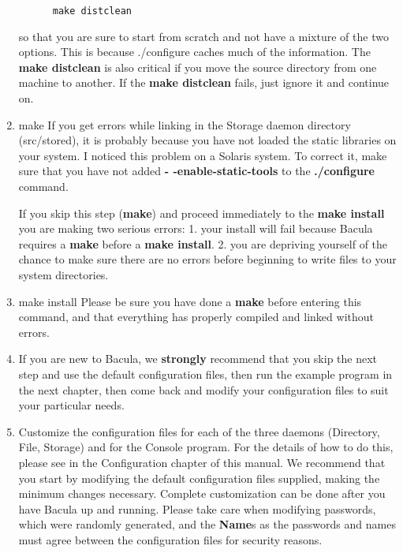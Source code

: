 \begin{enumerate}
\footnotesize
\begin{verbatim}
      make distclean
\end{verbatim}
\normalsize

so that you are sure to start from scratch and not have a  mixture of the two
options. This is because ./configure  caches much of the information. The {\bf
make distclean}  is also critical if you move the source directory from one 
machine to another. If the {\bf make distclean} fails,  just ignore it and
continue on.  

\item make  
   If you get errors while linking in the Storage daemon directory
   (src/stored), it is probably because you have not loaded the static
   libraries on your system.  I noticed this problem on a Solaris system.
   To correct it, make sure that you have not added {\bf
   {-} {-}enable-static-tools} to the {\bf ./configure} command.

   If you skip this step ({\bf make}) and proceed immediately to the {\bf
   make install} you are making two serious errors: 1.  your install will
   fail because Bacula requires a {\bf make} before a {\bf make install}.
   2.  you are depriving yourself of the chance to make sure there are no
   errors before beginning to write files to your system directories.
                                 

\item make install  
   Please be sure you have done a {\bf make} before entering this command,
   and that everything has properly compiled and linked without errors.


\item If you are new to Bacula, we {\bf strongly} recommend that you skip
   the next step and use the default configuration files, then run the
   example program in the next chapter, then come back and modify your
   configuration files to suit your particular needs.

\item Customize the configuration files for each of the three daemons 
   (Directory, File, Storage) and for the Console program.  For the details
   of how to do this, please see  in the Configuration chapter of this manual.  We
   recommend that you start by modifying the default configuration files
   supplied, making the minimum changes necessary.  Complete customization
   can be done after you have Bacula up and running.  Please take care when
   modifying passwords, which were randomly generated, and the {\bf Name}s
   as the passwords and names must agree between the configuration files
   for security reasons.  


\end{enumerate}
